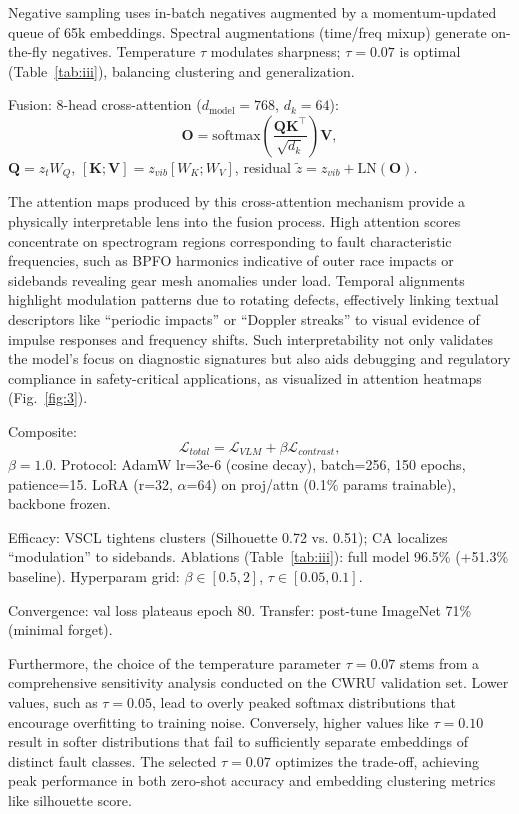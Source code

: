 Negative sampling uses in-batch negatives augmented by a momentum-updated queue of 65k embeddings. Spectral augmentations (time/freq mixup) generate on-the-fly negatives. Temperature $\tau$ modulates sharpness; $\tau=0.07$ is optimal (Table~\ref{tab:iii}), balancing clustering and generalization.

Fusion: 8-head cross-attention ($d_{\mathrm{model}}=768$, $d_k=64$):
\begin{equation}
\mathbf{O} = \mathrm{softmax}\left( \frac{\mathbf{Q} \mathbf{K}^\top}{\sqrt{d_k}} \right) \mathbf{V},
\label{eq:f5}
\end{equation}
$\mathbf{Q} = z_t W_Q$, $[\mathbf{K}; \mathbf{V}] = z_{vib} [W_K; W_V]$, residual $\tilde{z} = z_{vib} + \mathrm{LN}(\mathbf{O})$.

The attention maps produced by this cross-attention mechanism provide a physically interpretable lens into the fusion process. High attention scores concentrate on spectrogram regions corresponding to fault characteristic frequencies, such as BPFO harmonics indicative of outer race impacts or sidebands revealing gear mesh anomalies under load. Temporal alignments highlight modulation patterns due to rotating defects, effectively linking textual descriptors like ``periodic impacts'' or ``Doppler streaks'' to visual evidence of impulse responses and frequency shifts. Such interpretability not only validates the model's focus on diagnostic signatures but also aids debugging and regulatory compliance in safety-critical applications, as visualized in attention heatmaps (Fig.~\ref{fig:3}).

Composite:
\begin{equation}
\mathcal{L}_{total} = \mathcal{L}_{VLM} + \beta \mathcal{L}_{contrast},
\label{eq:f6}
\end{equation}
$\beta=1.0$. Protocol: AdamW lr=3e-6 (cosine decay), batch=256, 150 epochs, patience=15. LoRA (r=32, $\alpha$=64) on proj/attn (0.1\% params trainable), backbone frozen.

Efficacy: VSCL tightens clusters (Silhouette 0.72 vs. 0.51); CA localizes ``modulation'' to sidebands. Ablations (Table~\ref{tab:iii}): full model 96.5\% (+51.3\% baseline). Hyperparam grid: $\beta\in[0.5,2]$, $\tau\in[0.05,0.1]$.

Convergence: val loss plateaus epoch 80. Transfer: post-tune ImageNet 71\% (minimal forget).

Furthermore, the choice of the temperature parameter $\tau = 0.07$ stems from a comprehensive sensitivity analysis conducted on the CWRU validation set. Lower values, such as $\tau = 0.05$, lead to overly peaked softmax distributions that encourage overfitting to training noise. Conversely, higher values like $\tau = 0.10$ result in softer distributions that fail to sufficiently separate embeddings of distinct fault classes. The selected $\tau = 0.07$ optimizes the trade-off, achieving peak performance in both zero-shot accuracy and embedding clustering metrics like silhouette score.

